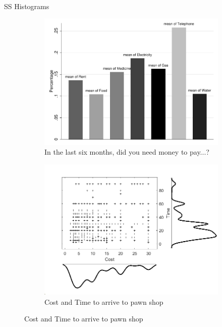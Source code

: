 \documentclass[9pt]{beamer}
\begin{document}
\begin{frame}{SS Histograms}

\begin{figure}[H]
    \label{nochoicehte_takeup_pred}
    \begin{center}
     \begin{subfigure}{0.45\textwidth}
        \caption{In the last six months, did you need money to pay...?}
        \centering
        \includegraphics[width=\textwidth]{Figuras/perc_utilities.pdf}
    \end{subfigure}
     \begin{subfigure}{0.45\textwidth}
        \caption{Cost and Time to arrive to pawn shop}
        \centering
        \includegraphics[width=\textwidth]{Figuras/cost_time_scatter_hist.png}
    \end{subfigure}
    \end{center}
    \end{figure}
    
\end{frame}
\end{document}
